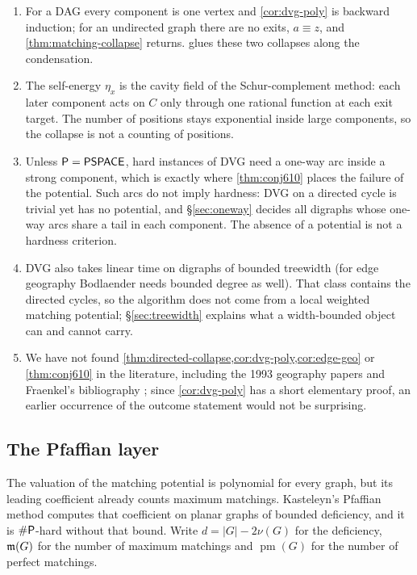 \begin{remark*}
\begin{enumerate}[label=(\arabic*)]
\item For a DAG every component is one vertex and \cref{cor:dvg-poly} is backward induction; for an undirected graph there are no exits, $a\equiv z$, and \cref{thm:matching-collapse} returns.  glues these two collapses along the condensation.
\item The self-energy $\eta_x$ is the cavity field of the Schur-complement method: each later component acts on $C$ only through one rational function at each exit target. The number of positions stays exponential inside large components, so the collapse is not a counting of positions.
\item Unless $\mathsf{P}=\mathsf{PSPACE}$, hard instances of DVG need a one-way arc inside a strong component, which is exactly where \cref{thm:conj610} places the failure of the potential. Such arcs do not imply hardness: DVG on a directed cycle is trivial yet has no potential, and \S\ref{sec:oneway} decides all digraphs whose one-way arcs share a tail in each component. The absence of a potential is not a hardness criterion.
\item DVG also takes linear time on digraphs of bounded treewidth \cite{Bodlaender} (for edge geography Bodlaender needs bounded degree as well). That class contains the directed cycles, so the algorithm does not come from a local weighted matching potential; \S\ref{sec:treewidth} explains what a width-bounded object can and cannot carry.
\item We have not found \cref{thm:directed-collapse,cor:dvg-poly,cor:edge-geo} or \cref{thm:conj610} in the literature, including the 1993 geography papers \cite{Bodlaender,FraenkelSimonson,FSU} and Fraenkel's bibliography \cite{FraenkelBib}; since \cref{cor:dvg-poly} has a short elementary proof, an earlier occurrence of the outcome statement would not be surprising.
\end{enumerate}
\end{remark*}

\subsection{The Pfaffian layer}\label{ssec:pfaffian}
The valuation of the matching potential is polynomial for every graph, but its leading coefficient already counts maximum matchings. Kasteleyn's Pfaffian method computes that coefficient on planar graphs of bounded deficiency, and it is $\#\mathsf{P}$-hard without that bound. Write $d=|G|-2\nu(G)$ for the deficiency, $\mathfrak{m}(G)$ for the number of maximum matchings and $\operatorname{pm}(G)$ for the number of perfect matchings.

